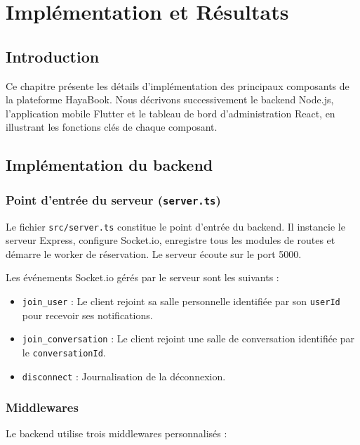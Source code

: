\chapter{Implémentation et Résultats}

\section{Introduction}

Ce chapitre présente les détails d'implémentation des principaux composants de la plateforme HayaBook. Nous décrivons successivement le backend Node.js, l'application mobile Flutter et le tableau de bord d'administration React, en illustrant les fonctions clés de chaque composant.

\section{Implémentation du backend}

\subsection{Point d'entrée du serveur (\texttt{server.ts})}

Le fichier \texttt{src/server.ts} constitue le point d'entrée du backend. Il instancie le serveur Express, configure Socket.io, enregistre tous les modules de routes et démarre le worker de réservation. Le serveur écoute sur le port 5000.

Les événements Socket.io gérés par le serveur sont les suivants :
\begin{itemize}
    \item \texttt{join\_user} : Le client rejoint sa salle personnelle identifiée par son \texttt{userId} pour recevoir ses notifications.
    \item \texttt{join\_conversation} : Le client rejoint une salle de conversation identifiée par le \texttt{conversationId}.
    \item \texttt{disconnect} : Journalisation de la déconnexion.
\end{itemize}

\subsection{Middlewares}

Le backend utilise trois middlewares personnalisés :

